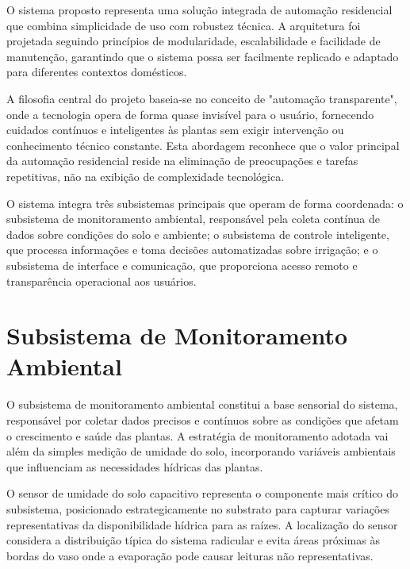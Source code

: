 \documentclass[twoside,english,brazilian]{UNISINOSmonografia}
\begin{document}
O sistema proposto representa uma solução integrada de automação residencial que combina simplicidade de uso com robustez técnica. A arquitetura foi projetada seguindo princípios de modularidade, escalabilidade e facilidade de manutenção, garantindo que o sistema possa ser facilmente replicado e adaptado para diferentes contextos domésticos.

A filosofia central do projeto baseia-se no conceito de "automação transparente", onde a tecnologia opera de forma quase invisível para o usuário, fornecendo cuidados contínuos e inteligentes às plantas sem exigir intervenção ou conhecimento técnico constante. Esta abordagem reconhece que o valor principal da automação residencial reside na eliminação de preocupações e tarefas repetitivas, não na exibição de complexidade tecnológica.

O sistema integra três subsistemas principais que operam de forma coordenada: o subsistema de monitoramento ambiental, responsável pela coleta contínua de dados sobre condições do solo e ambiente; o subsistema de controle inteligente, que processa informações e toma decisões automatizadas sobre irrigação; e o subsistema de interface e comunicação, que proporciona acesso remoto e transparência operacional aos usuários.


\section{Subsistema de Monitoramento Ambiental}

O subsistema de monitoramento ambiental constitui a base sensorial do sistema, responsável por coletar dados precisos e contínuos sobre as condições que afetam o crescimento e saúde das plantas. A estratégia de monitoramento adotada vai além da simples medição de umidade do solo, incorporando variáveis ambientais que influenciam as necessidades hídricas das plantas.

O sensor de umidade do solo capacitivo representa o componente mais crítico do subsistema, posicionado estrategicamente no substrato para capturar variações representativas da disponibilidade hídrica para as raízes. A localização do sensor considera a distribuição típica do sistema radicular e evita áreas próximas às bordas do vaso onde a evaporação pode causar leituras não representativas.
\end{document}
